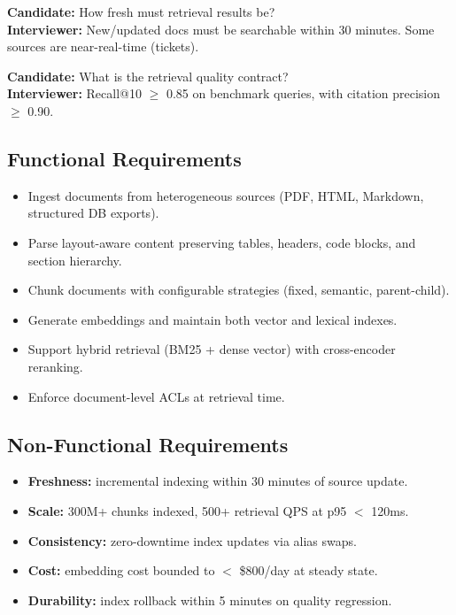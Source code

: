 \textbf{Candidate:} How fresh must retrieval results be?\\
\textbf{Interviewer:} New/updated docs must be searchable within 30 minutes. Some sources are near-real-time (tickets).

\textbf{Candidate:} What is the retrieval quality contract?\\
\textbf{Interviewer:} Recall@10 $\geq$ 0.85 on benchmark queries, with citation precision $\geq$ 0.90.

\subsection*{Functional Requirements}

\begin{itemize}
  \item Ingest documents from heterogeneous sources (PDF, HTML, Markdown, structured DB exports).
  \item Parse layout-aware content preserving tables, headers, code blocks, and section hierarchy.
  \item Chunk documents with configurable strategies (fixed, semantic, parent-child).
  \item Generate embeddings and maintain both vector and lexical indexes.
  \item Support hybrid retrieval (BM25 + dense vector) with cross-encoder reranking.
  \item Enforce document-level ACLs at retrieval time.
\end{itemize}

\subsection*{Non-Functional Requirements}

\begin{itemize}
  \item \textbf{Freshness:} incremental indexing within 30 minutes of source update.
  \item \textbf{Scale:} 300M+ chunks indexed, 500+ retrieval QPS at p95 $<$ 120ms.
  \item \textbf{Consistency:} zero-downtime index updates via alias swaps.
  \item \textbf{Cost:} embedding cost bounded to $<$ \$800/day at steady state.
  \item \textbf{Durability:} index rollback within 5 minutes on quality regression.
\end{itemize}

